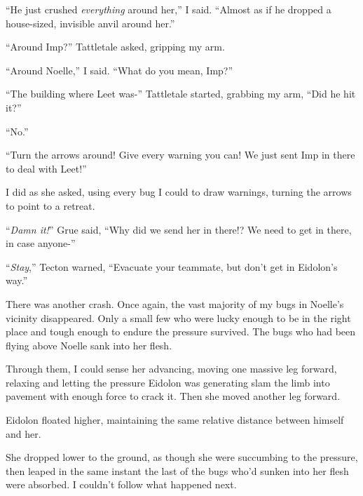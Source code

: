``He just crushed \emph{everything} around her,'' I said.  ``Almost as if he dropped a house-sized, invisible anvil around her.''



``Around Imp?''  Tattletale asked, gripping my arm.



``Around Noelle,'' I said.  ``What do you mean, Imp?''



``The building where Leet was-'' Tattletale started, grabbing my arm, ``Did he hit it?''



``No.''



``Turn the arrows around!  Give every warning you can!  We just sent Imp in there to deal with Leet!''



I did as she asked, using every bug I could to draw warnings, turning the arrows to point to a retreat.



``\emph{Damn it!}'' Grue said, ``Why did we send her in there!?  We need to get in there, in case anyone-''



``\emph{Stay},'' Tecton warned, ``Evacuate your teammate, but don't get in Eidolon's way.''



There was another crash.  Once again, the vast majority of my bugs in Noelle's vicinity disappeared.  Only a small few who were lucky enough to be in the right place and tough enough to endure the pressure survived.  The bugs who had been flying above Noelle sank into her flesh.



Through them, I could sense her advancing, moving one massive leg forward, relaxing and letting the pressure Eidolon was generating slam the limb into pavement with enough force to crack it.  Then she moved another leg forward.



Eidolon floated higher, maintaining the same relative distance between himself and her.



She dropped lower to the ground, as though she were succumbing to the pressure, then leaped in the same instant the last of the bugs who'd sunken into her flesh were absorbed.  I couldn't follow what happened next.



